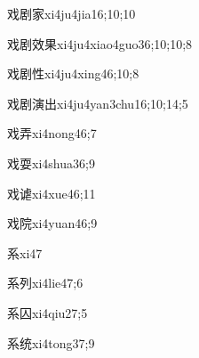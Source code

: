 \begin{verbete}{戏剧家}{xi4ju4jia1}{6;10;10}
\end{verbete}

\begin{verbete}{戏剧效果}{xi4ju4xiao4guo3}{6;10;10;8}
\end{verbete}

\begin{verbete}{戏剧性}{xi4ju4xing4}{6;10;8}
\end{verbete}

\begin{verbete}{戏剧演出}{xi4ju4yan3chu1}{6;10;14;5}
\end{verbete}

\begin{verbete}{戏弄}{xi4nong4}{6;7}
\end{verbete}

\begin{verbete}{戏耍}{xi4shua3}{6;9}
\end{verbete}

\begin{verbete}{戏谑}{xi4xue4}{6;11}
\end{verbete}

\begin{verbete}{戏院}{xi4yuan4}{6;9}
\end{verbete}

\begin{verbete}{系}{xi4}{7}
\end{verbete}

\begin{verbete}{系列}{xi4lie4}{7;6}
\end{verbete}

\begin{verbete}{系囚}{xi4qiu2}{7;5}
\end{verbete}

\begin{verbete}{系统}{xi4tong3}{7;9}
\end{verbete}

